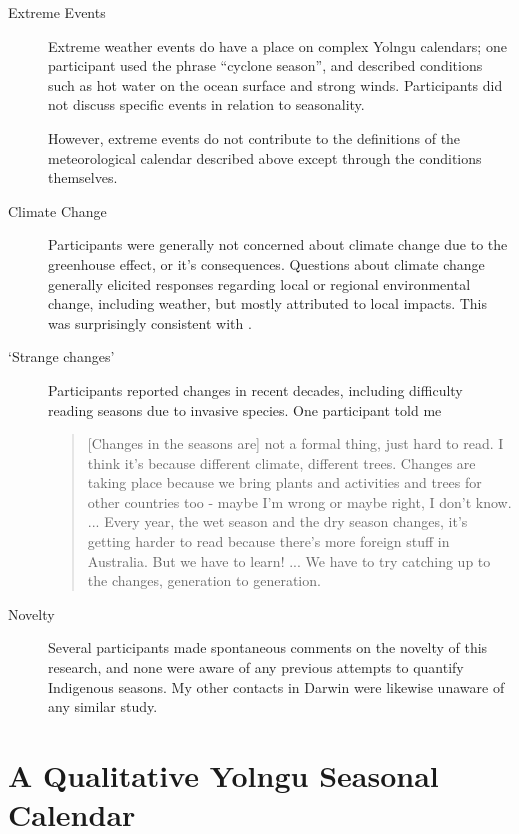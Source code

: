 \begin{description}
\item[Extreme Events]
    Extreme weather events do have a place on complex Yolngu calendars;
    one participant used the phrase ``cyclone season'', and described
    conditions such as hot water on the ocean surface and strong winds.
    Participants did not discuss specific events in relation to seasonality.

    However, extreme events do not contribute to the definitions of the
    meteorological calendar described above except through the conditions
    themselves.

\item[Climate Change]
    Participants were generally not concerned about climate change due to
    the greenhouse effect, or it's consequences.  Questions about climate
    change generally elicited responses regarding local or regional
    environmental change, including weather, but mostly attributed to
    local impacts.  This was surprisingly consistent with \citet{petheram2010}.

\item[`Strange changes']
    Participants reported changes in recent decades, including difficulty
    reading seasons due to invasive species.  One participant told me
    \begin{quote}
    [Changes in the seasons are] not a formal thing, just hard to read.
    I think it's because different climate, different trees.  Changes are
    taking place because we bring plants and activities and trees for
    other countries too - maybe I'm wrong or maybe right, I don't know.
    ...
    Every year, the wet season and the dry season changes, it's getting
    harder to read because there's more foreign stuff in Australia.
    But we have to learn! ... We have to try catching up to the changes,
    generation to generation.
    \end{quote}


\item[Novelty]
    Several participants made spontaneous comments on the novelty of this
    research, and none were aware of any previous attempts to quantify
    Indigenous seasons.  My other contacts in Darwin were likewise unaware
    of any similar study.
\end{description}



\section{A Qualitative Yolngu Seasonal Calendar}
\label{sec:calendar-description}

